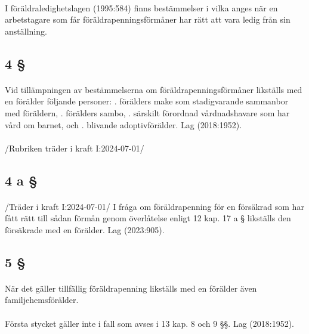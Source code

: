 \documentclass[a4paper,notitlepage,openany,10pt]{book}
\begin{document}
\paragraph*{}
I föräldraledighetslagen (1995:584) finns bestämmelser i vilka anges när en arbetstagare som får föräldrapenningsförmåner har rätt att vara ledig från sin anställning.
\subsection*{4 §}
\paragraph*{}
Vid tillämpningen av bestämmelserna om föräldrapenningsförmåner likställs med en förälder följande personer:
. förälders make som stadigvarande sammanbor med föräldern,
. förälders sambo,
. särskilt förordnad vårdnadshavare som har vård om barnet, och
. blivande adoptivförälder.
Lag (2018:1952).
\paragraph*{}
/Rubriken träder i kraft I:2024-07-01/
\subsection*{4 a §}
\paragraph*{}
/Träder i kraft I:2024-07-01/
I fråga om föräldrapenning för en försäkrad som har fått rätt till sådan förmån genom överlåtelse enligt 12 kap. 17 a § likställs den försäkrade med en förälder.
Lag (2023:905).
\subsection*{5 §}
\paragraph*{}
När det gäller tillfällig föräldrapenning likställs med en förälder även familjehemsförälder.
\paragraph*{}
Första stycket gäller inte i fall som avses i 13 kap. 8 och 9 §§.
Lag (2018:1952).
\end{document}
